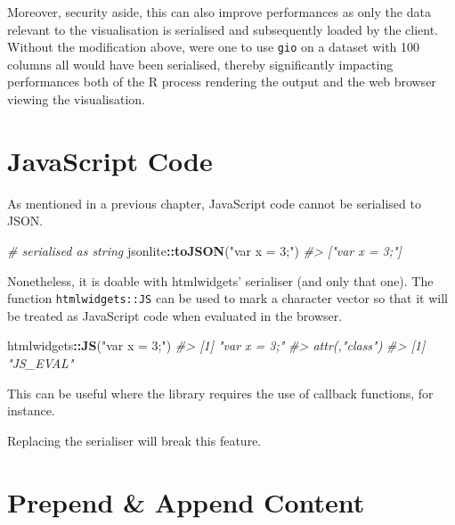 \documentclass[10pt,]{krantz}
\makeatletter
\newenvironment{Shaded}{\begin{snugshade}}{\end{snugshade}}
\newcommand{\CommentTok}[1]{\textcolor[rgb]{0.37,0.37,0.37}{\textit{#1}}}
\newcommand{\KeywordTok}[1]{\textcolor[rgb]{0.27,0.27,0.27}{\textbf{#1}}}
\newcommand{\NormalTok}[1]{#1}
\newcommand{\OperatorTok}[1]{\textcolor[rgb]{0.43,0.43,0.43}{\textbf{#1}}}
\newcommand{\StringTok}[1]{\textcolor[rgb]{0.5,0.5,0.5}{#1}}
\newenvironment{kframe}{%
\medskip{}
\setlength{\fboxsep}{.8em}
 \def\at@end@of@kframe{}%
 \ifinner\ifhmode%
  \def\at@end@of@kframe{\end{minipage}}%
  \begin{minipage}{\columnwidth}%
 \fi\fi%
 \def\FrameCommand##1{\hskip\@totalleftmargin \hskip-\fboxsep
 \colorbox{shadecolor}{##1}\hskip-\fboxsep
     \hskip-\linewidth \hskip-\@totalleftmargin \hskip\columnwidth}%
 \MakeFramed {\advance\hsize-\width
   \@totalleftmargin\z@ \linewidth\hsize
   \@setminipage}}%
 {\par\unskip\endMakeFramed%
 \at@end@of@kframe}
\renewenvironment{Shaded}{\begin{kframe}}{\end{kframe}}
\newenvironment{rmdblock}[1]
  {
  \begin{itemize}
  \renewcommand{\labelitemi}{
    \raisebox{-.7\height}[0pt][0pt]{
      {\setkeys{Gin}{width=3em,keepaspectratio}\texttt{[image: images/\#1]}}
    }
  }
  \setlength{\fboxsep}{1em}
  \begin{kframe}
  \item
  }
  {
  \end{kframe}
  \end{itemize}
  }
\newenvironment{rmdnote}
  {\begin{rmdblock}{note}}
  {\end{rmdblock}}
\makeatother
\begin{document}
Moreover, security aside, this can also improve performances as only the data relevant to the visualisation is serialised and subsequently loaded by the client. Without the modification above, were one to use \texttt{gio} on a dataset with 100 columns all would have been serialised, thereby significantly impacting performances both of the R process rendering the output and the web browser viewing the visualisation.

\hypertarget{widgets-adv-js}{%
\section{JavaScript Code}\label{widgets-adv-js}}

As mentioned in a previous chapter, JavaScript code cannot be serialised to JSON.

\begin{Shaded}
\begin{Highlighting}[]
\CommentTok{# serialised as string}
\NormalTok{jsonlite}\OperatorTok{::}\KeywordTok{toJSON}\NormalTok{(}\StringTok{"var x = 3;"}\NormalTok{)}
\CommentTok{#> ["var x = 3;"]}
\end{Highlighting}
\end{Shaded}

Nonetheless, it is doable with htmlwidgets' serialiser (and only that one). The function \texttt{htmlwidgets::JS} can be used to mark a character vector so that it will be treated as JavaScript code when evaluated in the browser.

\begin{Shaded}
\begin{Highlighting}[]
\NormalTok{htmlwidgets}\OperatorTok{::}\KeywordTok{JS}\NormalTok{(}\StringTok{"var x = 3;"}\NormalTok{)  }
\CommentTok{#> [1] "var x = 3;"}
\CommentTok{#> attr(,"class")}
\CommentTok{#> [1] "JS_EVAL"}
\end{Highlighting}
\end{Shaded}

This can be useful where the library requires the use of callback functions, for instance.

\begin{rmdnote}
Replacing the serialiser will break this feature.
\end{rmdnote}

\hypertarget{widgets-adv-prepend-append}{%
\section{Prepend \& Append Content}\label{widgets-adv-prepend-append}}
\end{document}

